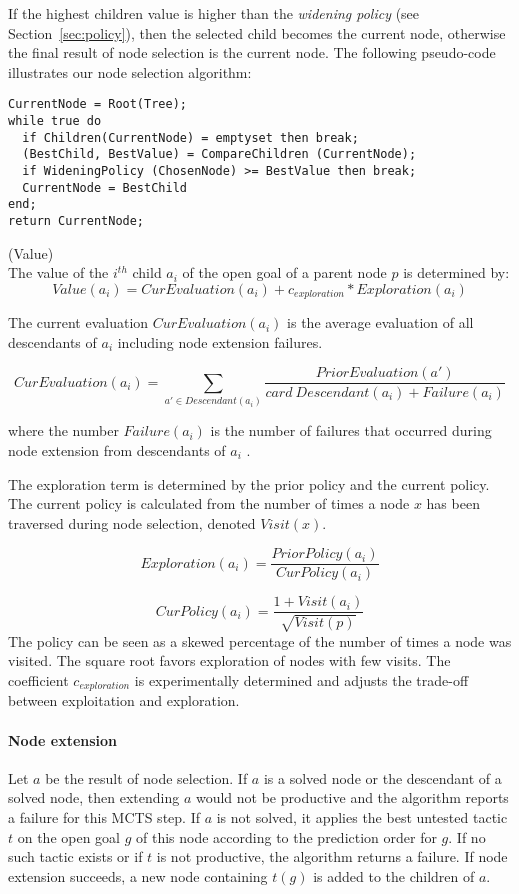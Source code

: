 \documentclass[runningheads,a4paper,draft]{svjour3}
\begin{document}
If the highest children value is higher than the \textit{widening policy} (see 
Section~\ref{sec:policy}), then the
selected child
becomes the current node, otherwise the final result of node selection is the
current node. The following pseudo-code illustrates our node selection 
algorithm:

\begin{lstlisting}[language=SMLSmall]
CurrentNode = Root(Tree);
while true do
  if Children(CurrentNode) = emptyset then break;
  (BestChild, BestValue) = CompareChildren (CurrentNode);
  if WideningPolicy (ChosenNode) >= BestValue then break;
  CurrentNode = BestChild
end;
return CurrentNode;
\end{lstlisting}

\begin{definition}\label{def:value}(Value)\\
The value of the $i^{th}$ child $a_i$ of the open goal of a parent node $p$
is determined by:
\[\mathit{Value}(a_i) = \mathit{CurEvaluation}(a_i) + c_{exploration} *
\mathit{Exploration}(a_i)\]

The current evaluation $CurEvaluation(a_i)$ is the average evaluation of
all descendants of $a_i$ including node extension failures.

\[\mathit{CurEvaluation}(a_i) =
  \sum_{a' \in Descendant(a_i)} \frac{\mathit{PriorEvaluation}(a')} {card\
  \mathit{Descendant}(a_i) + \mathit{Failure}(a_i)}\]

where the number $\mathit{Failure}(a_i)$ is the number of failures that occurred
during node extension from descendants of $a_i$ .

The exploration term is determined by the prior policy and the current policy.
The current policy is calculated from the number of times a node $x$ has been
traversed during node selection, denoted $\mathit{Visit}(x)$.

\[\mathit{Exploration}(a_i) =
\frac{\mathit{PriorPolicy}(a_i)}{\mathit{CurPolicy}(a_i)}\]

\[\mathit{CurPolicy}(a_i) = \frac{1 +
\mathit{Visit}(a_i)}{\sqrt{\mathit{Visit}(p)}}\]
The policy can be seen as a skewed percentage of the number of times a node was 
visited. The square root favors exploration of nodes with
few visits. The coefficient $c_{exploration}$ is experimentally determined and 
adjusts the trade-off between exploitation and exploration.
\end{definition}

\paragraph{Node extension}
Let $a$ be the result of node selection.
If $a$ is a solved node or the descendant of a solved node, then extending $a$
would not be productive and the algorithm reports a failure for this MCTS step.
If $a$ is not solved, it applies the best untested tactic $t$ on the open
goal $g$ of this
node according to the prediction order for $g$. 
If no such tactic exists or if $t$ is not productive, the algorithm returns a 
failure.
If node extension succeeds, a new node containing $t(g)$ is added to the
children of $a$.
\end{document}
